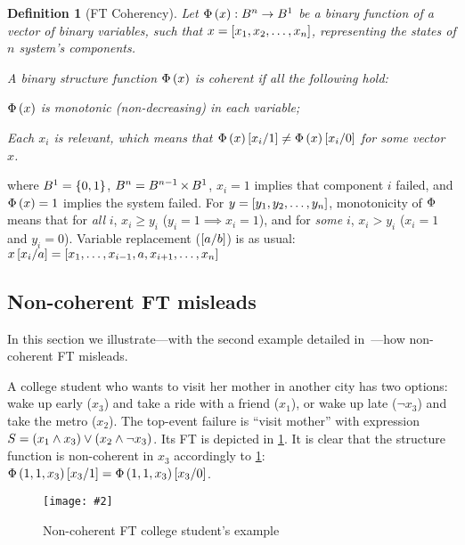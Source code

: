 \documentclass[12pt,openright,twoside,a4paper,oldfontcommands,english,brazil,final]{abntex2}
\newtheorem{definition}{Definition}[chapter]
\theoremstyle{theo}
\newcommand{\includegraphicsaspectratio}[2][1]{%
  \texttt{[image: \#2]}%
}
\newcommand{\setsin}[1]{\ensuremath\left\{ #1 \right\}}
\newcommand{\parsin}[1]{\ensuremath\left( #1 \right)}
\newcommand{\squaresin}[1]{\ensuremath\left[ #1 \right]}
\def\cartesian{\ensuremath\operatorname{\times}}
\def\ftcoherencyop{\ensuremath\operatorname{\Phi}}
\newcommand{\ftcoherency}[1]{\ensuremath\ftcoherencyop\parsin{#1}}
\newcommand{\replace}[2]{\ensuremath\squaresin{#1\middle/#2}}
\begin{document}
\begin{definition}[\ac{FT} Coherency]
\label{def:ft-coherency}
Let $\ftcoherency{x}:B^n \rightarrow B^1$ be a binary function of a vector of binary variables, such that $x = \squaresin{x_1, x_2,\ldots,x_n}$, representing the states of $n$ system's components.

A binary structure function $\ftcoherency{x}$ is coherent if all the following hold:
\begin{alineas}
  \item $\ftcoherency{x}$ is monotonic (non-decreasing) in each variable;
  \item Each $x_i$ is relevant, which means that $\ftcoherency{x}\replace{x_i}{1} \neq \ftcoherency{x}\replace{x_i}{0}$ for some vector $x$.
\end{alineas}%
\end{definition}%
%
\noindent where $B^1 = \setsin{0,1}$, $B^n = B^{n-1} \cartesian B^1$, $x_i = 1$ implies that component $i$ failed, and $\ftcoherency{x} = 1$ implies the system failed.
For $y = \squaresin{y_1,y_2,\ldots,y_n}$, monotonicity of $\ftcoherencyop$ means that for \emph{all} $i$, $x_i \ge y_i$ ($y_i = 1 \implies x_i = 1$), and for \emph{some} $i$, $x_i > y_i$ ($x_i = 1$ and $y_i = 0$).
Variable replacement ($\replace{a}{b}$) is as usual:
$x\replace{x_i}{a} = \squaresin{x_1, \ldots, x_{i-1}, a, x_{i+1}, \ldots, x_n}$

\subsection{Non-coherent \acl*{FT} misleads}
\label{sec:non-coherent-misleads-example}

In this section we illustrate---with the second example detailed in~\cite{Oliv2006}---how non-coherent \ac{FT} misleads.

A college student who wants to visit her mother in another city has two options: wake up early ($x_3$) and take a ride with a friend ($x_1$), or wake up late ($\lnot x_3$) and take the metro ($x_2$).
The top-event failure is ``visit mother'' with expression $S = \parsin{x_1 \land x_3} \lor \parsin{x_2 \land \lnot x_3}$.
Its \acl{FT} is depicted in \cref{fig:non-coherent-ft-example}.
It is clear that the structure function is non-coherent in $x_3$ accordingly to \cref{def:ft-coherency}: $\ftcoherency{1,1,x_3}\replace{x_3}{1}=\ftcoherency{1,1,x_3}\replace{x_3}{0}$.

\begin{figure}[htb]
  \centering
  \includegraphicsaspectratio[0.55]{non-coherent-ft-example}
  \caption{Non-coherent \ac{FT} college student's example}
  \label{fig:non-coherent-ft-example}
\end{figure}
\end{document}
